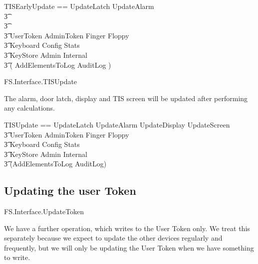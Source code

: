 \begin{zed}
        TISEarlyUpdate == UpdateLatch \land UpdateAlarm 
\\ \t3        \land [~ RealWorldChanges | screen' = screen \land
        display' = display ~]
\\ \t3   \land [\Delta IDStation | currentDisplay = currentDisplay' ]
\\ \t3 \land \Xi UserToken \land \Xi AdminToken \land \Xi Finger \land
\Xi Floppy \land 
\\ \t3  \Xi Keyboard \land \Xi Config \land
\Xi Stats  
\\ \t3 \land \Xi KeyStore \land \Xi Admin \land \Xi Internal
\\ \t3 \land ( AddElementsToLog \lor \Xi AuditLog ) 
\end{zed}

\begin{traceunit}{FS.Interface.TISUpdate}
\end{traceunit}



The alarm, door latch, display and TIS screen will be updated after performing any
calculations. 

\begin{zed}
        TISUpdate == UpdateLatch \land UpdateAlarm \land UpdateDisplay \land UpdateScreen
\\ \t3 \land \Xi UserToken \land \Xi AdminToken \land \Xi Finger \land
\Xi Floppy \land 
\\ \t3  \Xi Keyboard \land \Xi Config \land
\Xi Stats  
\\ \t3 \land \Xi KeyStore \land \Xi Admin \land \Xi Internal
\\ \t3 \land (AddElementsToLog \lor \Xi AuditLog) 
\end{zed}

\subsection{Updating the user Token}

\begin{traceunit}{FS.Interface.UpdateToken}
\end{traceunit}

We have a further operation, which writes to the User Token only.
We treat this separately because we expect to update the other devices
regularly and frequently,
but we will only be updating the User Token when we have something to
write. 

